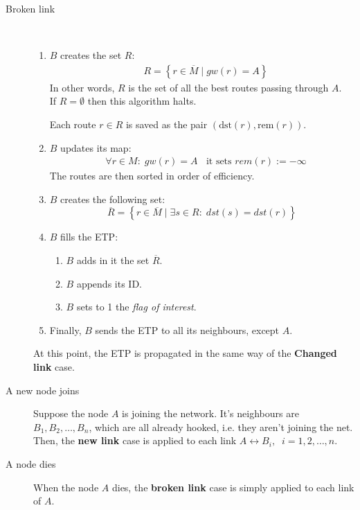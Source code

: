 \documentclass[a4paper]{article}
\newcommand{\T}[1]{\textrm{#1}}
\newcommand{\pgra}[1]{\left\{#1\right\}}
\newcommand{\eal}[1]{{\begin{align*} #1 \end{align*}}}
\def\ove#1{{\overline{#1}}}
\newcommand{\qq}{\qquad}
\def\0{{\emptyset}}
\def\8{{\infty}}
\begin{document}
\begin{description}
	\item[Broken link] \qq\\
		\begin{enumerate}
		\item \label{stepR} $B$ creates the set $R$:
			\eal{
			&R=\pgra{r\in \overline{M}\;|\; gw(r)=A}}
			In other words, 
			$R$ is the set of all the best routes passing through
			$A$. \\
			If $R=\0$ then this algorithm halts.
			
			Each route $r\in R$ is saved as the pair $(\T{dst}(r),
			\T{rem}(r))$.
		\item \label{upmap}
			$B$ updates its map:
			\eal{&\forall r\in M:\;gw(r)=A\;\;\T{ it sets }rem(r):=-\8}
			The routes are then sorted in order of efficiency.
		\item $B$ creates the following set:
			\[
			\ove R = \pgra{r\in \ove M\;|\;\exists s\in R:\;dst(s)=dst(r)}
			\]
		\item $B$ fills the ETP: 
			\begin{enumerate}
				\item $B$ adds in it the set $\ove R$.
				\item $B$ appends its ID.
				\item $B$ sets to 1 the \emph{flag of interest}.
			\end{enumerate}
		\item Finally, $B$ sends the ETP to all its neighbours, except $A$.
		\end{enumerate}
		At this point, the ETP is propagated in the same way of the
		\textbf{Changed link} case.
	\item[A new node joins]
		Suppose the node $A$ is joining the network. It's neighbours
		are $B_1, B_2,\dots, B_n$, which are all already hooked, i.e.
		they aren't joining the net. Then, the \textbf{new link} case is
		applied to each link $A\leftrightarrow B_i,\;\;i=1,2,\dots,n$.
	\item[A node dies]
		When the node $A$ dies, the \textbf{broken link} case is
		simply applied to each link of $A$.
\end{description}
\end{document}
